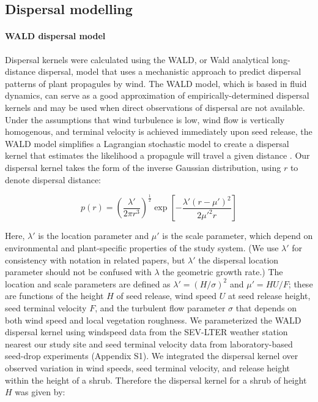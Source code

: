 \documentclass[11pt]{article}\usepackage[]{graphicx}\usepackage[usenames,dvipsnames]{xcolor}
\begin{document}
\subsection*{Dispersal modelling}
\paragraph{WALD dispersal model}
Dispersal kernels were calculated using the WALD, or Wald analytical long-distance dispersal, model that uses a mechanistic approach to predict dispersal patterns of plant propagules by wind.
The WALD model, which is based in fluid dynamics, can serve as a good approximation of empirically-determined dispersal kernels \citep{katul2005mechanistic, skarpaas2007dispersal} and may be used when direct observations of dispersal are not available. 
Under the assumptions that wind turbulence is low, wind flow is vertically homogenous, and terminal velocity is achieved immediately upon seed release, the WALD model simplifies a Lagrangian stochastic model to create a dispersal kernel that estimates the likelihood a propagule will travel a given distance \citep{katul2005mechanistic}.
Our dispersal kernel takes the form of the inverse Gaussian distribution, using $r$ to denote dispersal distance:

\begin{linenomath*} \begin{equation} p(r) = \left(\frac{\lambda'}{2 \pi r^3}\right)^\frac{1}{2} \exp\left[-\frac{\lambda'(r - \mu')^2}{2 \mu'^2 r}\right] \end{equation} \end{linenomath*} 

Here, $\lambda'$ is the location parameter and $\mu'$ is the scale parameter, which depend on environmental and plant-specific properties of the study system. 
(We use $\lambda'$ for consistency with notation in related papers, but $\lambda'$ the dispersal location parameter should not be confused with $\lambda$ the geometric growth rate.)
The location and scale parameters are defined as $\lambda' = (H/\sigma)^2$ and $\mu' = HU/F$; these are functions of the height $H$ of seed release, wind speed $U$ at seed release height, seed terminal velocity $F$, and the turbulent flow parameter $\sigma$ that depends on both wind speed and local vegetation roughness. 
We parameterized the WALD dispersal kernel using windspeed data from the SEV-LTER weather station nearest our study site \citep{SEVmet} and seed terminal velocity data from laboratory-based seed-drop experiments (Appendix S1). 
We integrated the dispersal kernel over observed variation in wind speeds, seed terminal velocity, and release height within the height of a shrub.
Therefore the dispersal kernel for a shrub of height $H$ was given by:
\end{document}
